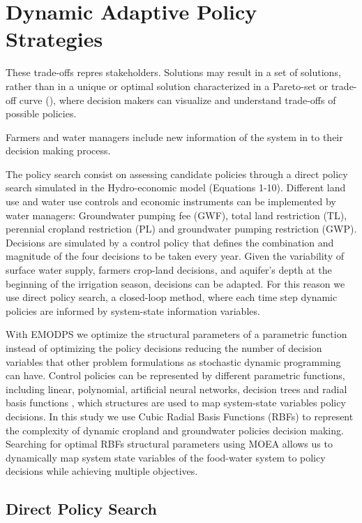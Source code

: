 \documentclass[11pt,a4paper]{article}
\begin{document}
\section{Dynamic Adaptive Policy Strategies}

These trade-offs repres stakeholders. Solutions may result in a set of solutions, rather than in a unique or optimal solution characterized in a Pareto-set or trade-off curve (\cite{greening_design_2004,null_pareto_2021}), where decision makers can visualize and understand trade-offs of possible policies.

Farmers and water managers include new information of the system in to their decision making process.

The policy search consist on assessing candidate policies through a direct policy search simulated in the Hydro-economic model (Equations 1-10). Different land use and water use controls and economic instruments can be implemented by water managers: Groundwater pumping fee (GWF), total land restriction (TL), perennial cropland restriction (PL) and groundwater pumping restriction (GWP). Decisions are simulated by a control policy that defines the combination and magnitude of the four decisions to be taken every year. Given the variability of surface water supply, farmers crop-land decisions, and aquifer's depth at the beginning of the irrigation season, decisions can be adapted. For this reason we use direct policy search, a closed-loop method, where each time step dynamic policies are informed by system-state information variables. 

With EMODPS we optimize the structural parameters of a parametric function instead of optimizing the policy decisions reducing the number of decision variables that other problem formulations as stochastic dynamic programming can have. Control policies can be represented by different  parametric functions, including linear, polynomial, artificial neural networks, decision trees and radial basis functions \cite{giuliani_universal_2014}, which structures are used to map system-state variables policy decisions. In this study we use Cubic Radial Basis Functions (RBFs) to represent the complexity of dynamic cropland and groundwater policies decision making. Searching for optimal RBFs structural parameters using MOEA allows us to dynamically map system state variables of the food-water system to policy decisions while achieving multiple objectives.

\subsection{Direct Policy Search}
\end{document}
